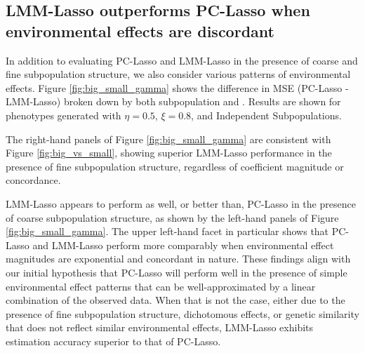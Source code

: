 \subsection{LMM-Lasso outperforms PC-Lasso when environmental effects are discordant}

In addition to evaluating PC-Lasso and LMM-Lasso in the presence of coarse and fine subpopulation structure, we also consider various patterns of environmental effects. Figure \ref{fig:big_small_gamma} shows the difference in MSE (PC-Lasso - LMM-Lasso) broken down by both subpopulation and . Results are shown for phenotypes generated with $\eta = 0.5$, $\xi = 0.8$, and Independent Subpopulations.


The right-hand panels of Figure \ref{fig:big_small_gamma} are consistent with Figure \ref{fig:big_vs_small}, showing superior LMM-Lasso performance in the presence of fine subpopulation structure, regardless of coefficient magnitude or concordance. 

LMM-Lasso appears to perform as well, or better than, PC-Lasso in the presence of coarse subpopulation structure, as shown by the left-hand panels of Figure \ref{fig:big_small_gamma}. The upper left-hand facet in particular shows that PC-Lasso and LMM-Lasso perform more comparably when environmental effect magnitudes are exponential and concordant in nature. 
These findings align with our initial hypothesis that PC-Lasso will perform well in the presence of simple environmental effect patterns that can be well-approximated by a linear combination of the observed data. When that is not the case, either due to the presence of fine subpopulation structure, dichotomous effects, or genetic similarity that does not reflect similar environmental effects, LMM-Lasso exhibits estimation accuracy superior to that of PC-Lasso.

